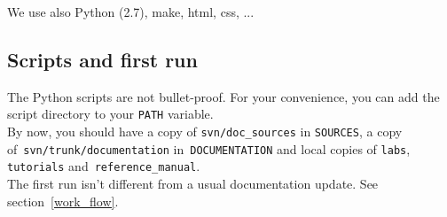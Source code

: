 \documentclass[a4paper,10pt]{article}
\newcommand{\code}[1]{\texttt{#1}}
\begin{document}
We use also Python (2.7), make, html, css, ...

\subsection{Scripts and first run}

The Python scripts are not bullet-proof. For your convenience, you can add the script directory to your \verb+PATH+ variable.\\

By now, you should have a copy of \code{svn/doc\_sources} in \code{SOURCES}, a copy of~\code{svn/trunk/documentation} in~\code{DOCUMENTATION} and local copies of \code{labs}, \code{tutorials} and~\code{reference\_manual}.\\

The first run isn't different from a usual documentation update. See section~\ref{work_flow}.




% 
% 


\end{document}
